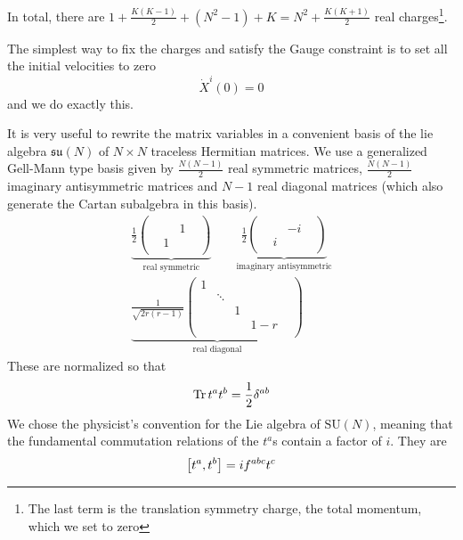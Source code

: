 In total, there are $1 + \frac{K(K-1)}{2} + (N^2 - 1) + K = N^2 + \frac{K(K+1)}{2}$ real charges\footnote{The last term is the translation symmetry charge, the total momentum, which we set to zero}. 

The simplest way to fix the charges and satisfy the Gauge constraint is to set all the initial velocities to zero
\begin{equation}
  \dot{X}^i(0) = 0
\end{equation}
and we do exactly this.

It is very useful to rewrite the matrix variables in a convenient basis of the lie algebra $\mathfrak{su}(N)$ of $N \times N$ traceless Hermitian matrices. We use a generalized Gell-Mann type basis given by $\frac{N(N-1)}{2}$ real symmetric matrices, $\frac{N(N-1)}{2}$ imaginary antisymmetric matrices and $N-1$ real diagonal matrices (which also generate the Cartan subalgebra in this basis).
\begin{equation}\label{eqn:suN-basis}
  \begin{gathered}
    \underbrace{
      \frac{1}{2}\begin{pmatrix}
      & & & \\
      & & 1 & \\
      & 1 & & \\
      & & &
    \end{pmatrix}}_{\text{real symmetric}} \qquad%
    \underbrace{
      \frac{1}{2}\begin{pmatrix}
      & & & \\
      & & -i & \\
      & i & & \\
      & & &
    \end{pmatrix}}_{\text{imaginary antisymmetric}} \\
    \underbrace{
      \frac{1}{\sqrt{2r(r-1)}}\begin{pmatrix}
      1 & & & & \\
      & \ddots & & & \\
      & & 1 & & \\
      & & & 1-r & \\
      & & & &
    \end{pmatrix}}_{\text{real diagonal}}
  \end{gathered}
\end{equation}
These are normalized so that
\begin{equation}\label{eqn:cartan-killing}
\Tr t^{a} t^{b} = \frac{1}{2} \delta^{a b}
\end{equation}
We chose the physicist's convention for the Lie algebra of $\mathrm{SU}(N)$, meaning that the fundamental commutation relations of the $t^a$s contain a factor of $i$. They are
\begin{equation}
\comm{t^a}{t^b} = i f^{a b c} t^{c}
\end{equation}

